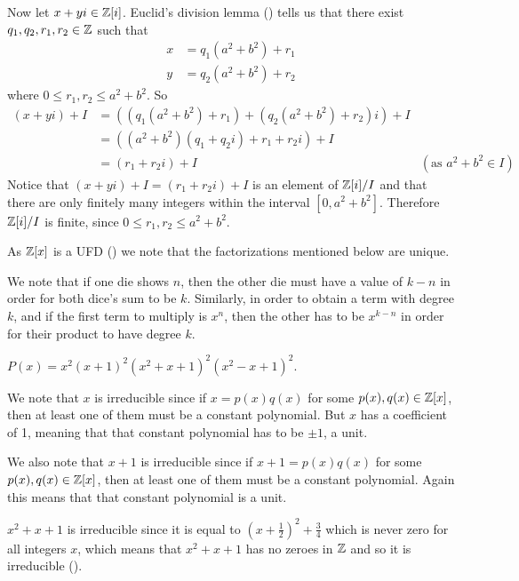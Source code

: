 \begin{questions}
    Now let $x+yi \in \mathbb{Z}[i]$. Euclid's division lemma () tells us that there exist $q_1, q_2, r_1, r_2 \in \mathbb{Z}$ such that
    \begin{align*}
        x &= q_1(a^2+b^2) + r_1\\
        y &= q_2(a^2+b^2) + r_2
    \end{align*}
    where $0 \leq r_1, r_2 \leq a^2+b^2$. So
    \begin{align*}
        (x+yi)+I &= \left(\left(q_1(a^2+b^2) + r_1\right) + \left(q_2(a^2+b^2) + r_2\right)i\right) + I\\
        &= \left((a^2+b^2)(q_1+q_2i) + r_1 + r_2i\right) + I\\
        &= (r_1 + r_2i) + I & (\text{as } a^2+b^2 \in I)
    \end{align*}
    Notice that $(x+yi)+I = (r_1+r_2i)+I$ is an element of $\mathbb{Z}[i]/I$ and that there are only finitely many integers within the interval $[0, a^2+b^2]$. Therefore $\mathbb{Z}[i]/I$ is finite, since $0 \leq r_1, r_2 \leq a^2+b^2$.
    
    \item As $\mathbb{Z}[x]$ is a UFD () we note that the factorizations mentioned below are unique.
    \begin{partquestions}{\roman*}
        \item We note that if one die shows $n$, then the other die must have a value of $k - n$ in order for both dice's sum to be $k$. Similarly, in order to obtain a term with degree $k$, and if the first term to multiply is $x^n$, then the other has to be $x^{k-n}$ in order for their product to have degree $k$.
        
        \item $P(x) = x^2(x+1)^2(x^2+x+1)^2(x^2-x+1)^2$.
        
        We note that $x$ is irreducible since if $x = p(x)q(x)$ for some $p(x), q(x) \in \mathbb{Z}[x]$, then at least one of them must be a constant polynomial. But $x$ has a coefficient of 1, meaning that that constant polynomial has to be $\pm1$, a unit.

        We also note that $x+1$ is irreducible since if $x+1 = p(x)q(x)$ for some $p(x), q(x) \in \mathbb{Z}[x]$, then at least one of them must be a constant polynomial. Again this means that that constant polynomial is a unit.

        $x^2+x+1$ is irreducible since it is equal to $(x+\frac12)^2 + \frac34$ which is never zero for all integers $x$, which means that $x^2+x+1$ has no zeroes in $\mathbb{Z}$ and so it is irreducible ().


\end{partquestions}
\end{questions}
